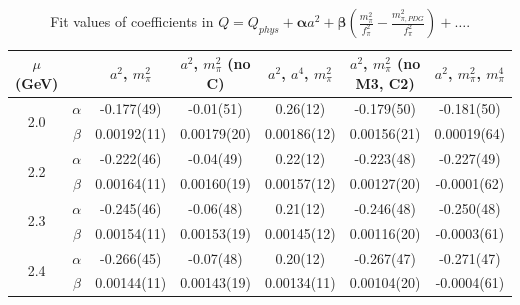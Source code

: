 \documentclass[12pt]{extarticle}
\begin{document}
\begin{table}[h!]
\begin{center}
\begin{tabular}{|c c|c|c|c|c|c|}
\hline
$\mu$ (GeV) &  & $a^2$, $m_\pi^2$& $a^2$, $m_\pi^2$ (no C)& $a^2$, $a^4$, $m_\pi^2$& $a^2$, $m_\pi^2$ (no M3, C2)& $a^2$, $m_\pi^2$, $m_\pi^4$\\
\hline
\multirow{2}{0.5in}{2.0} & $\alpha$ & -0.177(49)& -0.01(51)& 0.26(12)& -0.179(50)& -0.181(50)\\
 & $\beta$ & 0.00192(11)& 0.00179(20)& 0.00186(12)& 0.00156(21)& 0.00019(64)\\
\hline
\multirow{2}{0.5in}{2.2} & $\alpha$ & -0.222(46)& -0.04(49)& 0.22(12)& -0.223(48)& -0.227(49)\\
 & $\beta$ & 0.00164(11)& 0.00160(19)& 0.00157(12)& 0.00127(20)& -0.0001(62)\\
\hline
\multirow{2}{0.5in}{2.3} & $\alpha$ & -0.245(46)& -0.06(48)& 0.21(12)& -0.246(48)& -0.250(48)\\
 & $\beta$ & 0.00154(11)& 0.00153(19)& 0.00145(12)& 0.00116(20)& -0.0003(61)\\
\hline
\multirow{2}{0.5in}{2.4} & $\alpha$ & -0.266(45)& -0.07(48)& 0.20(12)& -0.267(47)& -0.271(47)\\
 & $\beta$ & 0.00144(11)& 0.00143(19)& 0.00134(11)& 0.00104(20)& -0.0004(61)\\
\hline
\end{tabular}
\caption{Fit values of coefficients in $Q = Q_{phys} + \mathbf{\alpha} a^2 + \mathbf{\beta}\left(\frac{m_\pi^2}{f_\pi^2}-\frac{m_{\pi,PDG}^2}{f_\pi^2}\right) + \ldots$.}
\end{center}
\end{table}




















\clearpage
\end{document}
